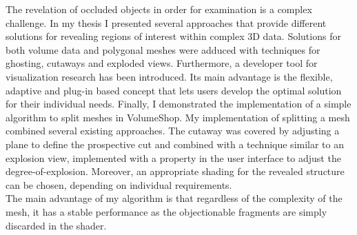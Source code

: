 

The revelation of occluded objects in order for examination is a complex challenge. In my thesis I presented several approaches that provide different solutions for revealing regions of interest within complex 3D data. Solutions for both volume data and polygonal meshes were adduced with techniques for ghosting, cutaways and exploded views. Furthermore, a developer tool for visualization research has been introduced. Its main advantage is the flexible, adaptive and plug-in based concept that lets users develop the optimal solution for their individual needs. Finally, I demonstrated the implementation of a simple algorithm to split meshes in VolumeShop. My implementation of splitting a mesh combined several existing approaches. The cutaway was covered by adjusting a plane to define the prospective cut and combined with a technique similar to an explosion view, implemented with a property in the user interface to adjust the degree-of-explosion. Moreover, an appropriate shading for the revealed structure can be chosen, depending on individual requirements.\\
The main advantage of my algorithm is that regardless of the complexity of the mesh, it has a stable performance as the objectionable fragments are simply discarded in the shader.